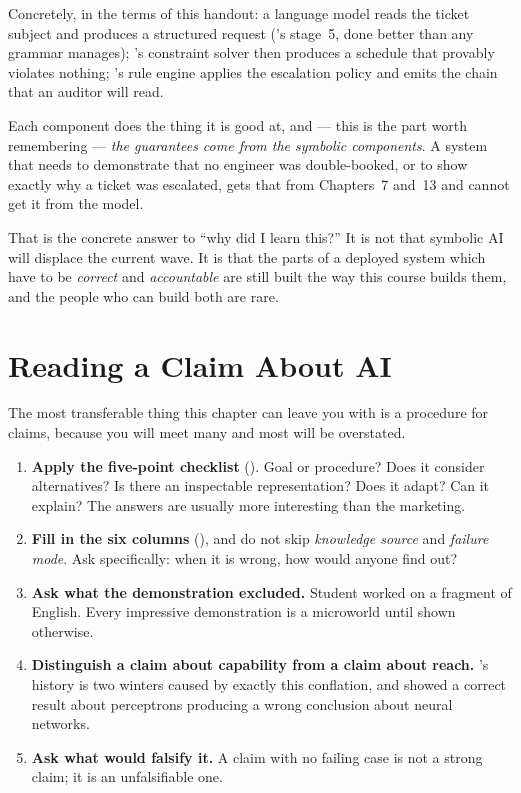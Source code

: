 \begin{conceptbox}
Concretely, in the terms of this handout: a language model reads the ticket subject
and produces a structured request ('s stage~5, done better than any
grammar manages); 's constraint solver then produces a schedule that
provably violates nothing; 's rule engine applies the escalation
policy and emits the chain that an auditor will read.

Each component does the thing it is good at, and --- this is the part worth
remembering --- \emph{the guarantees come from the symbolic components}. A system
that needs to demonstrate that no engineer was double-booked, or to show exactly why
a ticket was escalated, gets that from Chapters~7 and~13 and cannot get it from the
model.

That is the concrete answer to ``why did I learn this?'' It is not that symbolic AI
will displace the current wave. It is that the parts of a deployed system which have
to be \emph{correct} and \emph{accountable} are still built the way this course
builds them, and the people who can build both are rare.
\end{conceptbox}

\section{Reading a Claim About AI}

The most transferable thing this chapter can leave you with is a procedure for
claims, because you will meet many and most will be overstated.

\begin{enumerate}[leftmargin=2.2em, itemsep=3pt, topsep=4pt]
  \item \textbf{Apply the five-point checklist} (). Goal or
        procedure? Does it consider alternatives? Is there an inspectable
        representation? Does it adapt? Can it explain? The answers are usually more
        interesting than the marketing.
  \item \textbf{Fill in the six columns} (), and do not skip
        \emph{knowledge source} and \emph{failure mode}. Ask specifically: when it
        is wrong, how would anyone find out?
  \item \textbf{Ask what the demonstration excluded.} Student worked on a fragment
        of English. Every impressive demonstration is a microworld until shown
        otherwise.
  \item \textbf{Distinguish a claim about capability from a claim about reach.}
        's history is two winters caused by exactly this
        conflation, and  showed a correct result about perceptrons
        producing a wrong conclusion about neural networks.
  \item \textbf{Ask what would falsify it.} A claim with no failing case is not a
        strong claim; it is an unfalsifiable one.
\end{enumerate}

